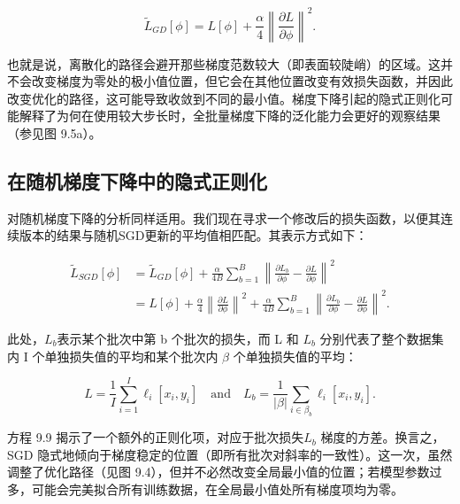 \begin{equation}
\tilde{L}_{GD}[\phi] = L[\phi] + \frac{\alpha}{4} \left\| \frac{\partial L}{\partial \phi} \right\|^2 . 
\end{equation}

也就是说，离散化的路径会避开那些梯度范数较大（即表面较陡峭）的区域。这并不会改变梯度为零处的极小值位置，但它会在其他位置改变有效损失函数，并因此改变优化的路径，这可能导致收敛到不同的最小值。梯度下降引起的隐式正则化可能解释了为何在使用较大步长时，全批量梯度下降的泛化能力会更好的观察结果（参见图 9.5a）。

\subsection{在随机梯度下降中的隐式正则化}
对随机梯度下降的分析同样适用。我们现在寻求一个修改后的损失函数，以便其连续版本的结果与随机SGD更新的平均值相匹配。其表示方式如下：


\begin{align}
	\tilde{L}_{SGD}[\phi] &= \tilde{L}_{GD}[\phi] + \frac{\alpha}{4B} \sum_{b=1}^{B} \left\| \frac{\partial L_b}{\partial \phi} - \frac{\partial L}{\partial \phi} \right\|^2 \\
	&= L[\phi] + \frac{\alpha}{4} \left\| \frac{\partial L}{\partial \phi} \right\|^2 + \frac{\alpha}{4B} \sum_{b=1}^{B} \left\| \frac{\partial L_b}{\partial \phi} - \frac{\partial L}{\partial \phi} \right\|^2 . 
\end{align} 


此处，\(L_b\)表示某个批次中第 b 个批次的损失，而 L 和 \(L_b\) 分别代表了整个数据集内 I 个单独损失值的平均和某个批次内 \(\beta\) 个单独损失值的平均：

\begin{equation}
L = \frac{1}{I} \sum_{i=1}^{I} \ell_i[x_i, y_i] \quad \text{and} \quad L_b = \frac{1}{|\beta|} \sum_{i \in \beta_b} \ell_i[x_i, y_i]. 
\end{equation}

方程 9.9 揭示了一个额外的正则化项，对应于批次损失\(L_b\) 梯度的方差。换言之，SGD 隐式地倾向于梯度稳定的位置（即所有批次对斜率的一致性）。这一次，虽然调整了优化路径（见图 9.4），但并不必然改变全局最小值的位置；若模型参数过多，可能会完美拟合所有训练数据，在全局最小值处所有梯度项均为零。

